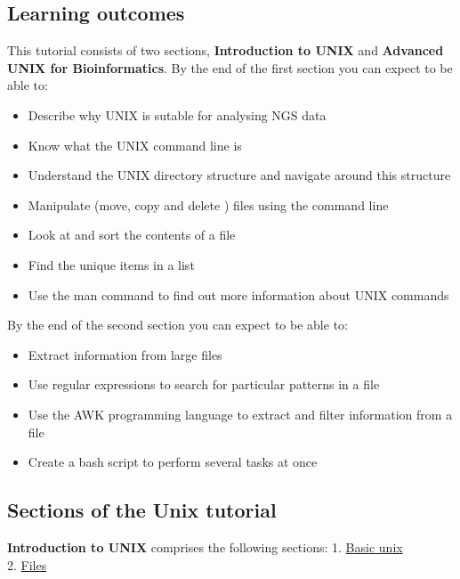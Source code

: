 \documentclass[11pt]{article}
\providecommand{\tightlist}{%
      \setlength{\itemsep}{0pt}\setlength{\parskip}{0pt}}
\begin{document}
\hypertarget{learning-outcomes}{%
\subsection{Learning outcomes}\label{learning-outcomes}}

This tutorial consists of two sections, \textbf{Introduction to UNIX}
and \textbf{Advanced UNIX for Bioinformatics}. By the end of the first
section you can expect to be able to:

\begin{itemize}
\tightlist
\item
  Describe why UNIX is sutable for analysing NGS data
\item
  Know what the UNIX command line is
\item
  Understand the UNIX directory structure and navigate around this
  structure
\item
  Manipulate (move, copy and delete ) files using the command line
\item
  Look at and sort the contents of a file
\item
  Find the unique items in a list
\item
  Use the man command to find out more information about UNIX commands
\end{itemize}

By the end of the second section you can expect to be able to:

\begin{itemize}
\tightlist
\item
  Extract information from large files
\item
  Use regular expressions to search for particular patterns in a file
\item
  Use the AWK programming language to extract and filter information
  from a file
\item
  Create a bash script to perform several tasks at once
\end{itemize}

\hypertarget{sections-of-the-unix-tutorial}{%
\subsection{Sections of the Unix
tutorial}\label{sections-of-the-unix-tutorial}}

\textbf{Introduction to UNIX} comprises the following sections: 1.
\href{basic.ipynb}{Basic unix}\\
2. \href{files.ipynb}{Files}
\end{document}
